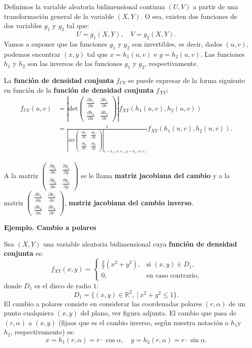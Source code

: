 \documentclass[]{book}
\begin{document}
Definimos la variable aleatoria bidimensional continua \((U,V)\) a partir de una transformación general de la variable \((X,Y)\). O sea, existen dos funciones de dos variables \(g_1\) y \(g_2\) tal que:
\[
U  = g_1 (X,Y),\quad 
V  = g_2 (X,Y).
\]
Vamos a suponer que las funciones \(g_1\) y \(g_2\) son invertibles, es decir, dados \((u,v)\), podemos encontrar \((x,y)\) tal que \(x=h_1(u,v)\) e \(y=h_2(u,v)\). Las funciones \(h_1\) y \(h_2\) son las inversas de las funciones \(g_1\) y \(g_2\), respectivamente.

La \textbf{función de densidad conjunta} \(f_{UV}\) se puede expresar de la forma siguiente en función de la \textbf{función de densidad conjunta} \(f_{XY}\):
\[
\begin{array}{rl}
f_{UV}(u,v) & =\left|\mathrm{det}\begin{pmatrix}\frac{\partial h_1}{\partial u} & \frac{\partial h_1}{\partial v}\\ \frac{\partial h_2}{\partial u} & \frac{\partial h_2}{\partial v}\end{pmatrix}\right|f_{XY}(h_1(u,v),h_2(u,v))\\ & =\frac{1}{\left|\mathrm{det}\begin{pmatrix}\frac{\partial g_1}{\partial x} & \frac{\partial g_1}{\partial y}\\ \frac{\partial g_2}{\partial x} & \frac{\partial g_2}{\partial y}\end{pmatrix}\right|_{x=h_1(u,v),y=h_2(u,v)}}f_{XY}(h_1(u,v),h_2(u,v)).
\end{array}
\]

A la matriz \(\begin{pmatrix}\frac{\partial g_1}{\partial x} & \frac{\partial g_1}{\partial y}\\ \frac{\partial g_2}{\partial x} & \frac{\partial g_2}{\partial y}\end{pmatrix}\) se le llama \textbf{matriz jacobiana del cambio} y a la matriz \(\begin{pmatrix}\frac{\partial h_1}{\partial u} & \frac{\partial h_1}{\partial v}\\ \frac{\partial h_2}{\partial u} & \frac{\partial h_2}{\partial v}\end{pmatrix}\), \textbf{matriz jacobiana del cambio inverso}.

\textbf{Ejemplo. Cambio a polares}

Sea \((X,Y)\) una variable aleatoria bidimensional cuya \textbf{función de densidad conjunta} es:
\[
f_{XY}(x,y)=
\begin{cases}
\frac{2}{\pi}\left(x^2 + y^2\right), & \mbox{si }(x,y)\in D_1, \\
0, & \mbox{en caso contrario,}
\end{cases}
\]
donde \(D_1\) es el disco de radio \(1\):
\[
D_1 = \{(x,y)\in\mathbb{R}^2,\ | \ x^2+y^2\leq 1\}.
\]
El cambio a polares consiste en considerar las coordenadas polares \((r,\alpha)\) de un punto cualquiera \((x,y)\) del plano, ver figura adjunta. El cambio que pasa de \((r,\alpha)\) a \((x,y)\) (fijaos que es el cambio inverso, según nuestra notación o \(h_1\)y \(h_2\), respectivamente) es:
\[
x=h_1(r,\alpha)=r\cdot \cos\alpha,\quad y=h_2(r,\alpha)=r\cdot \sin\alpha.
\]
\end{document}
